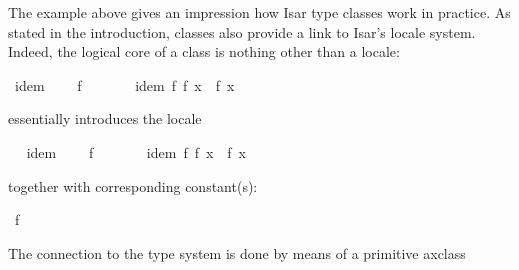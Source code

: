 \begin{isabellebody}
{}
\isamarkuptrue%
%
\isamarkuptrue%
%
\begin{isamarkuptext}%
The example above gives an impression how Isar type classes work
  in practice.  As stated in the introduction, classes also provide
  a link to Isar's locale system.  Indeed, the logical core of a class
  is nothing other than a locale:%
\end{isamarkuptext}%
\isamarkuptrue%
%
\isadelimquote
%
\endisadelimquote
%
\isatagquote
{}\isamarkupfalse%
\ idem\ {\isacharequal}\isanewline
\ \ \ f\ {\isacharcolon}{\isacharcolon}\ {\isachardoublequoteopen}{\isasymalpha}\ {\isasymRightarrow}\ {\isasymalpha}{\isachardoublequoteclose}\isanewline
\ \ \ idem{\isacharcolon}\ {\isachardoublequoteopen}f\ {\isacharparenleft}f\ x{\isacharparenright}\ {\isacharequal}\ f\ x{\isachardoublequoteclose}%
\endisatagquote
{\isafoldquote}%
%
\isadelimquote
%
\endisadelimquote
%
\begin{isamarkuptext}%
\noindent essentially introduces the locale%
\end{isamarkuptext}%
\isamarkuptrue%
\ %
\isadeliminvisible
%
\endisadeliminvisible
%
\isataginvisible
%
\endisataginvisible
{\isafoldinvisible}%
%
\isadeliminvisible
%
\endisadeliminvisible
%
\isadelimquote
%
\endisadelimquote
%
\isatagquote
{}\isamarkupfalse%
\ idem\ {\isacharequal}\isanewline
\ \ \ f\ {\isacharcolon}{\isacharcolon}\ {\isachardoublequoteopen}{\isasymalpha}\ {\isasymRightarrow}\ {\isasymalpha}{\isachardoublequoteclose}\isanewline
\ \ \ idem{\isacharcolon}\ {\isachardoublequoteopen}f\ {\isacharparenleft}f\ x{\isacharparenright}\ {\isacharequal}\ f\ x{\isachardoublequoteclose}%
\endisatagquote
{\isafoldquote}%
%
\isadelimquote
%
\endisadelimquote
%
\begin{isamarkuptext}%
\noindent together with corresponding constant(s):%
\end{isamarkuptext}%
\isamarkuptrue%
%
\isadelimquote
%
\endisadelimquote
%
\isatagquote
{}\isamarkupfalse%
\ f\ {\isacharcolon}{\isacharcolon}\ {\isachardoublequoteopen}{\isasymalpha}\ {\isasymRightarrow}\ {\isasymalpha}{\isachardoublequoteclose}%
\endisatagquote
{\isafoldquote}%
%
\isadelimquote
%
\endisadelimquote
%
\begin{isamarkuptext}%
\noindent The connection to the type system is done by means
  of a primitive axclass%
\end{isamarkuptext}%
\isamarkuptrue%
\ %

\end{isabellebody}
